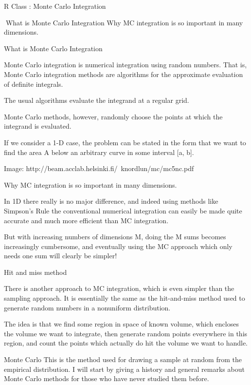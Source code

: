 R Class : Monte Carlo Integration

What is Monte Carlo Integration
Why MC integration is so important in many dimensions.


What is Monte Carlo Integration

Monte Carlo integration is numerical integration using random numbers. That is, Monte Carlo integration methods are algorithms for the approximate evaluation of definite integrals.

The usual algorithms evaluate the integrand at a regular grid. 

Monte Carlo methods, however, randomly choose the points at which the integrand is evaluated.

If we consider a 1-D case, the problem can be stated in the form that we want to find the
area A below an arbitrary curve in some interval [a, b].

Image: http://beam.acclab.helsinki.fi/~knordlun/mc/mc5nc.pdf


Why MC integration is so important in many dimensions.

In 1D there really is no major difference, and indeed using methods like Simpson’s Rule the
conventional numerical integration can easily be made quite accurate and much more
efficient than MC integration.

But with increasing numbers of dimensions M, doing the M sums becomes increasingly cumbersome, and eventually using the MC approach which only needs one sum will clearly be simpler!


Hit and miss method

There is another approach to MC integration, which is even simpler than the sampling approach.
It is essentially the same as the hit-and-miss method used to generate random numbers in a
nonuniform distribution. 

The idea is that we find some region in space of known volume, which encloses the volume we want to integrate, then generate random points everywhere in this region, and count the points which actually do hit the volume we want to handle.


Monte Carlo
This is the method used for drawing a sample at random from the empirical distribution. I will start by giving a history and general remarks about Monte Carlo methods for those who have never studied them before.

